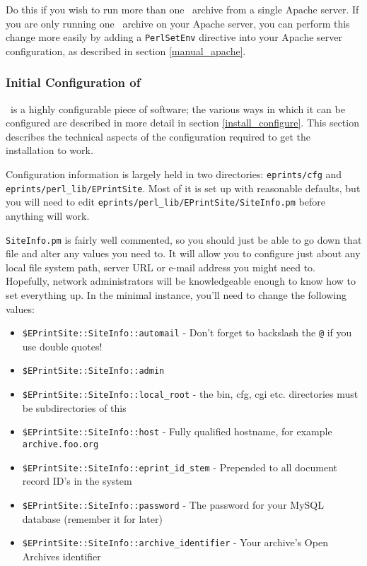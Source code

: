 Do this if you wish to run more than one \eprints\ archive from a single Apache server. If you are only running one \eprints\ archive on your Apache server, you can perform this change more easily by adding a {\tt PerlSetEnv} directive into your Apache server configuration, as described in section \ref{manual_apache}.



\subsubsection{Initial Configuration of \eprints}

\eprints\ is a highly configurable piece of software; the various ways in which it can be configured are described in more detail in section \ref{install_configure}. This section describes the technical aspects of the configuration required to get the installation to work.

Configuration information is largely held in two directories: {\tt eprints/cfg} and {\tt eprints/perl\_lib/EPrintSite}. Most of it is set up with reasonable defaults, but you will need to edit {\tt eprints/perl\_lib/EPrintSite/SiteInfo.pm} before anything will work.

{\tt SiteInfo.pm} is fairly well commented, so you should just be able to go down that file and alter any values you need to. It will allow you to configure just about any local file system path, server URL or e-mail address you might need to. Hopefully, network administrators will be knowledgeable enough to know how to set everything up. In the minimal instance, you'll need to change the following values:

\begin{itemize}
\item {\tt \$EPrintSite::SiteInfo::automail} - Don't forget to backslash the {\tt @} if you use double quotes!
\item {\tt \$EPrintSite::SiteInfo::admin}
\item {\tt \$EPrintSite::SiteInfo::local\_root} - the bin, cfg, cgi etc. directories must be subdirectories of this
\item {\tt \$EPrintSite::SiteInfo::host} - Fully qualified hostname, for example {\tt archive.foo.org}
\item {\tt \$EPrintSite::SiteInfo::eprint\_id\_stem} - Prepended to all document record ID's in the system
\item {\tt \$EPrintSite::SiteInfo::password} - The password for your MySQL database (remember it for later)
\item {\tt \$EPrintSite::SiteInfo::archive\_identifier} - Your archive's Open Archives identifier
\end{itemize}

